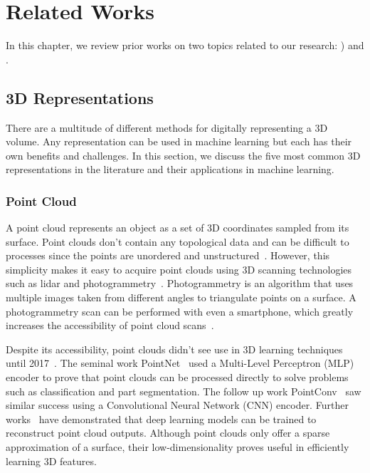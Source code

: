 
\chapter{Related Works}
\label{chap:related_works}

In this chapter, we review prior works on two topics related to our research: ) and .

\section{3D Representations}
\label{sec:3d_representations}

There are a multitude of different methods for digitally representing a 3D volume. Any representation can be used in machine learning but each has their own benefits and challenges. In this section, we discuss the five most common 3D representations in the literature and their applications in machine learning.


\subsection{Point Cloud}
\label{subsec:point_cloud}

A point cloud represents an object as a set of 3D coordinates sampled from its surface. Point clouds don't contain any topological data and can be difficult to processes since the points are unordered and unstructured~\cite{Xiao2020}. However, this simplicity makes it easy to acquire point clouds using 3D scanning technologies such as lidar and photogrammetry~\cite{Leberl2010}. Photogrammetry is an algorithm that uses multiple images taken from different angles to triangulate points on a surface. A photogrammetry scan can be performed with even a smartphone, which greatly increases the accessibility of point cloud scans~\cite{Micheletti2015}.

Despite its accessibility, point clouds didn't see use in 3D learning techniques until 2017~\cite{Xiao2020}. The seminal work PointNet~\cite{Qi2017} used a Multi-Level Perceptron (MLP) encoder to prove that point clouds can be processed directly to solve problems such as classification and part segmentation. The follow up work PointConv~\cite{Wu2019} saw similar success using a Convolutional Neural Network (CNN) encoder. Further works~\cite{Fan2017, Achlioptas2018} have demonstrated that deep learning models can be trained to reconstruct point cloud outputs. Although point clouds only offer a sparse approximation of a surface, their low-dimensionality proves useful in efficiently learning 3D features.


